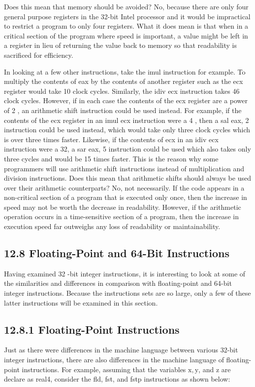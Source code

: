 \documentclass[10pt]{article}
\begin{document}
Does this mean that memory should be avoided? No, because there are only four general purpose registers in the 32-bit Intel processor and it would be impractical to restrict a program to only four registers. What it does mean is that when in a critical section of the program where speed is important, a value might be left in a register in lieu of returning the value back to memory so that readability is sacrificed for efficiency.

In looking at a few other instructions, take the imul instruction for example. To multiply the contents of eax by the contents of another register such as the ecx register would take 10 clock cycles. Similarly, the idiv ecx instruction takes 46 clock cycles. However, if in each case the contents of the ecx register are a power of 2 , an arithmetic shift instruction could be used instead. For example, if the contents of the ecx register in an imul ecx instruction were a 4 , then a sal eax, 2 instruction could be used instead, which would take only three clock cycles which is over three times faster. Likewise, if the contents of ecx in an idiv ecx instruction were a 32, a sar eax, 5 instruction could be used which also takes only three cycles and would be 15 times faster. This is the reason why some programmers will use arithmetic shift instructions instead of multiplication and division instructions. Does this mean that arithmetic shifts should always be used over their arithmetic counterparts? No, not necessarily. If the code appears in a non-critical section of a program that is executed only once, then the increase in speed may not be worth the decrease in readability. However, if the arithmetic operation occurs in a time-sensitive section of a program, then the increase in execution speed far outweighs any loss of readability or maintainability.

\subsection*{12.8 Floating-Point and 64-Bit Instructions}
Having examined 32 -bit integer instructions, it is interesting to look at some of the similarities and differences in comparison with floating-point and 64-bit integer instructions. Because the instructions sets are so large, only a few of these latter instructions will be examined in this section.

\subsection*{12.8.1 Floating-Point Instructions}
Just as there were differences in the machine language between various 32-bit integer instructions, there are also differences in the machine language of floating-point instructions. For example, assuming that the variables $\mathrm{x}, \mathrm{y}$, and z are declare as real4, consider the fld, fst, and fstp instructions as shown below:
\end{document}
